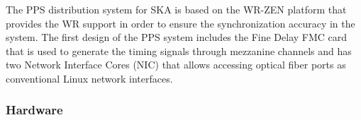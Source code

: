 
The PPS distribution system for SKA is based on the WR-ZEN platform that provides the WR support in order to ensure the synchronization accuracy in the system. The first design of the PPS system includes the Fine Delay FMC card that is used to generate the timing signals through mezzanine channels and has two Network Interface Cores (NIC) that allows accessing optical fiber ports as conventional Linux network interfaces.

\subsubsection{Hardware}
\label{subsec:hardware}

%
%

